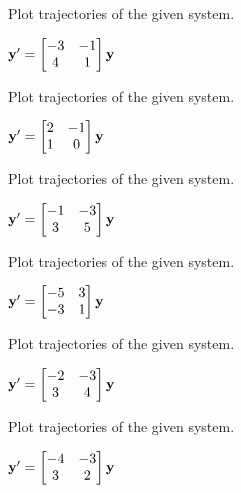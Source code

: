 \documentclass{ximera}
\begin{document}
 \begin{problem}\label{exer:10.5.36}
 Plot trajectories of the given system.
 
 ${\bf y}'=  \begin{bmatrix}-3&-1\\4&1\end{bmatrix}{\bf y}$
  \end{problem}

 \begin{problem}\label{exer:10.5.37}  
 Plot trajectories of the given system.
 
 ${\bf y}'=  \begin{bmatrix}2&-1\\1&0\end{bmatrix}{\bf y}$
  \end{problem}


 \begin{problem}\label{exer:10.5.38} 
 Plot trajectories of the given system.
 
 ${\bf y}'=  \begin{bmatrix}-1&-3\\3&5\end{bmatrix}{\bf y}$
  \end{problem}

 \begin{problem}\label{exer:10.5.39}  
 Plot trajectories of the given system.
 
 ${\bf y}'=  \begin{bmatrix}-5&3\\-3&1\end{bmatrix}{\bf y}$
 \end{problem}


 \begin{problem}\label{exer:10.5.40} 
 Plot trajectories of the given system.
 
 ${\bf y}'=  \begin{bmatrix}-2&-3\\3&4\end{bmatrix}{\bf y}$
  \end{problem}

 \begin{problem}\label{exer:10.5.41} 
 Plot trajectories of the given system.
 
 ${\bf y}'=  \begin{bmatrix}-4&-3\\3&2\end{bmatrix}{\bf y}$
  \end{problem}
\end{document}
